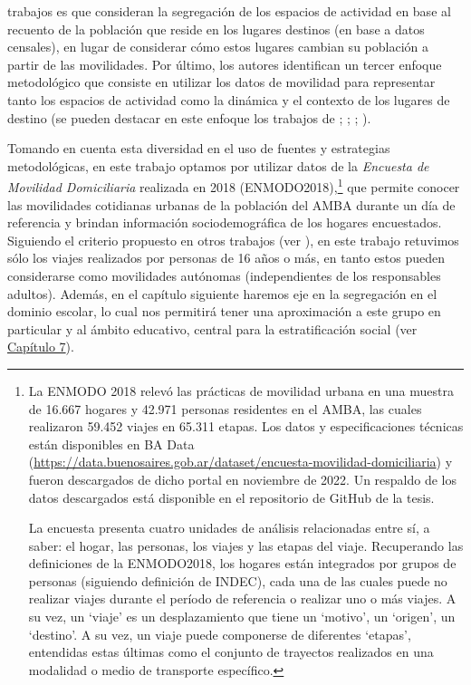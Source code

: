 \documentclass[
  spanish,
  a4paper,%
  chapterprefix=true,%
  DIV=calc,%
  twoside]{scrbook}%
\begin{document}
trabajos es que consideran la segregación de los espacios de actividad
en base al recuento de la población que reside en los lugares destinos
(en base a datos censales), en lugar de considerar cómo estos lugares
cambian su población a partir de las movilidades. Por último, los
autores identifican un tercer enfoque metodológico que consiste en
utilizar los datos de movilidad para representar tanto los espacios de
actividad como la dinámica y el contexto de los lugares de destino (se
pueden destacar en este enfoque los trabajos de ; ; ; ).

Tomando en cuenta esta diversidad en el uso de fuentes y estrategias
metodológicas, en este trabajo optamos por utilizar datos de la
\emph{Encuesta de Movilidad Domiciliaria} realizada en 2018
(ENMODO2018),\footnote{La ENMODO 2018 relevó las prácticas de
  movilidad urbana en una muestra de 16.667 hogares y 42.971 personas
  residentes en el AMBA, las cuales realizaron 59.452 viajes en 65.311
  etapas. Los datos y especificaciones técnicas están disponibles en
  BA Data
  (\url{https://data.buenosaires.gob.ar/dataset/encuesta-movilidad-domiciliaria})
  y fueron descargados de dicho portal en noviembre de 2022. Un
  respaldo de los datos descargados está disponible en el repositorio
  de GitHub de la tesis.

  La encuesta presenta cuatro unidades de análisis relacionadas entre
  sí, a saber: el hogar, las personas, los viajes y las etapas del
  viaje. Recuperando las definiciones de la ENMODO2018, los hogares
  están integrados por grupos de personas (siguiendo definición de
  INDEC), cada una de las cuales puede no realizar viajes durante el
  período de referencia o realizar uno o más viajes. A su vez, un
  `viaje' es un desplazamiento que tiene un `motivo', un `origen', un
  `destino'. A su vez, un viaje puede componerse de diferentes
  `etapas', entendidas estas últimas como el conjunto de trayectos
  realizados en una modalidad o medio de transporte específico.} que permite conocer las
movilidades cotidianas urbanas de la población del AMBA durante un día
de referencia y brindan información sociodemográfica de los hogares
encuestados. Siguiendo el criterio propuesto en otros trabajos (ver ), en este trabajo retuvimos sólo los viajes realizados por
personas de 16 años o más, en tanto estos pueden considerarse como
movilidades autónomas (independientes de los responsables adultos).
Además, en el capítulo siguiente haremos eje en la segregación en el
dominio escolar, lo cual nos permitirá tener una aproximación a este
grupo en particular y al ámbito educativo, central para la
estratificación social (ver \hyperref[school]{Capítulo 7}).
\end{document}
